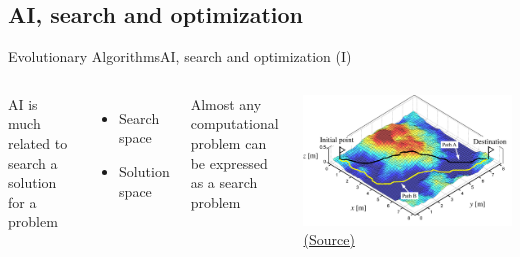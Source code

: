\documentclass[10pt,compress]{beamer} %
\begin{document}
\subsection{AI, search and optimization}
\begin{frame}{Evolutionary Algorithms}{AI, search and optimization (I)}
    \begin{columns}
	AI is much related to search a solution for a problem
	\begin{itemize}
	\item Search space
	\item Solution space
	\end{itemize}
	Almost any computational problem can be expressed as a search problem
	\begin{center}
	\includegraphics[width=\linewidth]{figs/path.jpg}\\
	\tiny{\href{http://www.astro.mech.tohoku.ac.jp/~ishigami/research/path\_plan.html}{(Source)}}
	\end{center}
	   \end{columns}
\end{frame}
\end{document}
